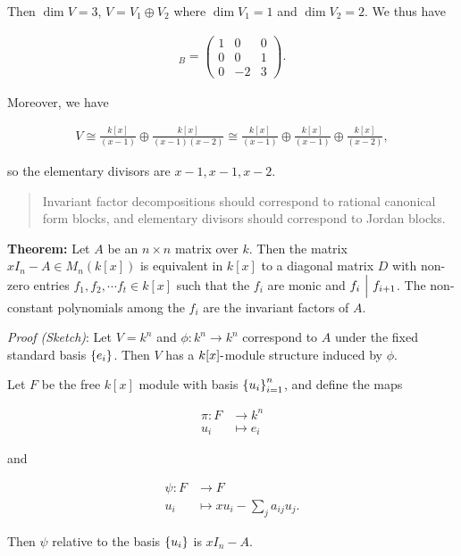 Then \(\dim V = 3\), \(V = V_1 \oplus V_2\) where \(\dim V_1 = 1\) and
\(\dim V_2 = 2\). We thus have

\begin{align*}
[\phi]_B =
\left(\begin{array}{ccc}
1 & 0 & 0 \\
0 & 0 & 1 \\
0 & -2 & 3
\end{array}\right)
.\end{align*}

Moreover, we have

\begin{align*}
V
\cong \frac{k[x]}{(x-1)} \oplus \frac{k[x]}{(x-1)(x-2)}
\cong \frac{k[x]}{(x-1)} \oplus \frac{k[x]}{(x-1)} \oplus \frac{k[x]}{(x-2)}
,\end{align*}

so the elementary divisors are \(x-1, x-1, x-2\).

\begin{quote}
Invariant factor decompositions should correspond to rational canonical
form blocks, and elementary divisors should correspond to Jordan blocks.
\end{quote}

\textbf{Theorem:} Let \(A\) be an \(n\times n\) matrix over \(k\). Then
the matrix \(xI_n - A \in M_n(k[x])\) is equivalent in \(k[x]\) to a
diagonal matrix \(D\) with non-zero entries
\(f_1, f_2, \cdots f_t \in k[x]\) such that the \(f_i\) are monic and
\(f_i {~\Bigm| ~} f_{i+1}\). The non-constant polynomials among the \(f_i\)
are the invariant factors of \(A\).

\emph{Proof (Sketch)}: Let \(V = k^n\) and \(\phi: k^n \to k^n\)
correspond to \(A\) under the fixed standard basis \(\left\{{e_i}\right\}\).
Then \(V\) has a \(k[x]{\hbox{-}}\)module structure induced by \(\phi\).

Let \(F\) be the free \(k[x]\) module with basis
\(\left\{{u_i}\right\}_{i=1}^n\), and define the maps

\begin{align*}
\pi: F &\to k^n \\
u_i &\mapsto e_i
\end{align*}

and

\begin{align*}
\psi: F &\to F \\
u_i &\mapsto xu_i - \sum_j a_{ij} u_j
.\end{align*}

Then \(\psi\) relative to the basis \(\left\{{u_i}\right\}\) is \(xI_n - A\).

